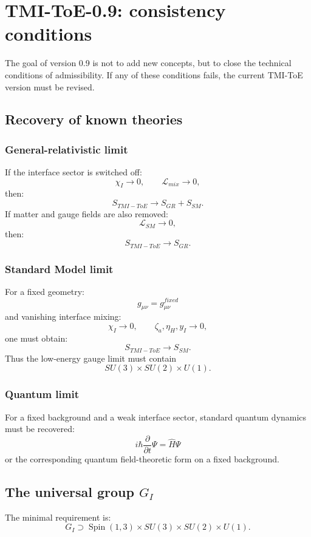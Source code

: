 \documentclass[12pt,a4paper]{article}
\DeclareMathOperator{\Spin}{Spin}
\begin{document}
\section{TMI-ToE-0.9: consistency conditions}

The goal of version 0.9 is not to add new concepts, but to close the technical conditions of admissibility. If any of these conditions fails, the current TMI-ToE version must be revised.

\subsection{Recovery of known theories}

\subsubsection*{General-relativistic limit}

If the interface sector is switched off:
\[
\chi_I\to0,\qquad \mathcal L_{mix}\to0,
\]
then:
\[
\boxed{S_{TMI-ToE}\to S_{GR}+S_{SM}}.
\]
If matter and gauge fields are also removed:
\[
\mathcal L_{SM}\to0,
\]
then:
\[
\boxed{S_{TMI-ToE}\to S_{GR}}.
\]

\subsubsection*{Standard Model limit}

For a fixed geometry:
\[
g_{\mu\nu}=g_{\mu\nu}^{fixed}
\]
and vanishing interface mixing:
\[
\chi_I\to0,\qquad \zeta_a,\eta_H,y_I\to0,
\]
one must obtain:
\[
\boxed{S_{TMI-ToE}\to S_{SM}}.
\]
Thus the low-energy gauge limit must contain
\[
\boxed{SU(3)\times SU(2)\times U(1)}.
\]

\subsubsection*{Quantum limit}

For a fixed background and a weak interface sector, standard quantum dynamics must be recovered:
\[
\boxed{i\hbar\frac{\partial}{\partial t}\Psi=\widehat H\Psi}
\]
or the corresponding quantum field-theoretic form on a fixed background.

\subsection{The universal group $G_I$}

The minimal requirement is:
\[
\boxed{G_I\supset \Spin(1,3)\times SU(3)\times SU(2)\times U(1)}.
\]
\end{document}
